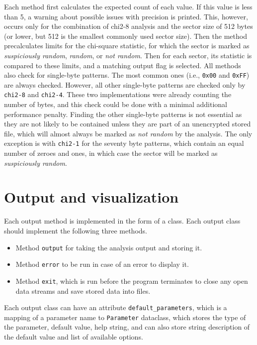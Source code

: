 \documentclass[
  digital, %
  oneside, %
  lof,     %
  lot,     %
]{fithesis4}
\begin{document}
Each method first calculates the expected count of each value.
If this value is less than 5, a warning about possible issues with precision\cite{knuth81} is printed.
This, however, occurs only for the combination of chi2-8 analysis and the sector size of 512 bytes (or lower, but 512 is the smallest commonly used sector size).
Then the method precalculates limits for the chi-square statistic, for which the sector is marked as \emph{suspiciously random}, \emph{random}, or \emph{not random}.
Then for each sector, its statistic is compared to these limits, and a matching output flag is selected.
All methods also check for single-byte patterns. The most common ones (i.e., \texttt{0x00} and \texttt{0xFF}) are always checked.
However, all other single-byte patterns are checked only by \texttt{chi2-8} and \texttt{chi2-4}.
These two implementations were already counting the number of bytes, and this check could be done with a minimal additional performance penalty.
Finding the other single-byte patterns is not essential as they are not likely to be contained unless they are part of an unencrypted stored file, which will almost always be marked as \emph{not random} by the analysis.
The only exception is with \texttt{chi2-1} for the seventy byte patterns, which contain an equal number of zeroes and ones, in which case the sector will be marked as \emph{suspiciously random}.

\section{Output and visualization}

Each output method is implemented in the form of a class.
Each output class should implement the following three methods.
\begin{itemize}
    \item Method \texttt{output} for taking the analysis output and storing it.
    \item Method \texttt{error} to be run in case of an error to display it.
    \item Method \texttt{exit}, which is run before the program terminates to close any open data streams and save stored data into files.
\end{itemize}
Each output class can have an attribute \texttt{default\_parameters}, which is a mapping of a parameter name to \texttt{Parameter} dataclass, which stores the type of the parameter, default value, help string, and can also store string description of the default value and list of available options.
\end{document}
